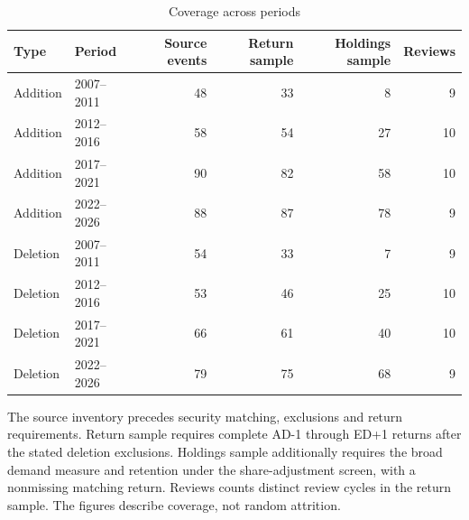 \begin{table}[!htbp]
\centering
\caption{Coverage across periods}\label{tab:sample_by_period}
\small
\setlength{\tabcolsep}{5pt}
\begin{tabular}{llrrrr}
\toprule
Type & Period & Source events & Return sample & Holdings sample & Reviews \\
\midrule
Addition & 2007--2011 & 48 & 33 & 8 & 9 \\
Addition & 2012--2016 & 58 & 54 & 27 & 10 \\
Addition & 2017--2021 & 90 & 82 & 58 & 10 \\
Addition & 2022--2026 & 88 & 87 & 78 & 9 \\
Deletion & 2007--2011 & 54 & 33 & 7 & 9 \\
Deletion & 2012--2016 & 53 & 46 & 25 & 10 \\
Deletion & 2017--2021 & 66 & 61 & 40 & 10 \\
Deletion & 2022--2026 & 79 & 75 & 68 & 9 \\
\bottomrule
\end{tabular}
\begin{minipage}{\linewidth}\footnotesize\vspace{5pt}
The source inventory precedes security matching, exclusions and return requirements. Return sample requires complete AD-1 through ED+1 returns after the stated deletion exclusions. Holdings sample additionally requires the broad demand measure and retention under the share-adjustment screen, with a nonmissing matching return. Reviews counts distinct review cycles in the return sample. The figures describe coverage, not random attrition.
\end{minipage}
\end{table}
